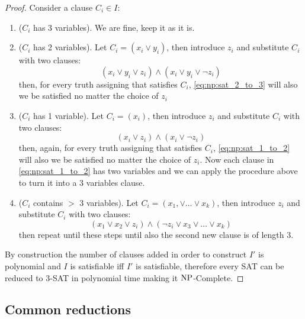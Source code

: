 \documentclass[12pt]{extarticle}
\newcommand{\NP}{{\operatorfont NP}}
\newcommand{\NPC}{$\NP$-Complete}
\begin{document}
\begin{proof}
    Consider a clause $C_i \in I$:
    \begin{enumerate}[label=\roman*.]
        \item ($C_i$ has 3 variables). We are fine, keep it as it is.
        \item ($C_i$ has 2 variables). Let $C_i = (x_i \lor y_i)$, then introduce $z_i$ and substitute $C_i$ with two clauses:
              \begin{equation}
                  \label{eq:np:sat_2_to_3}
                  (x_i \lor y_i \lor z_i) \land (x_i \lor y_i \lor \lnot z_i)
              \end{equation}
              then, for every truth assigning that satisfies $C_i$, \autoref{eq:np:sat_2_to_3} will also we be satisfied no matter the choice of $z_i$
        \item ($C_i$ has 1 variable). Let $C_i = (x_i)$, then introduce $z_i$ and substitute $C_i$ with two clauses:
              \begin{equation}
                  \label{eq:np:sat_1_to_2}
                  (x_i \lor z_i) \land (x_i \lor \lnot z_i)
              \end{equation}
              then, again, for every truth assigning that satisfies $C_i$, \autoref{eq:np:sat_1_to_2} will also we be satisfied no matter the choice of $z_i$.
              Now each clause in \autoref{eq:np:sat_1_to_2} has two variables and we can apply the procedure above to turn it into a 3 variables clause.
        \item ($C_i$ contains $>$ 3 variables). Let $C_i = (x_1, \lor \dots \lor x_k)$, then introduce $z_i$ and substitute $C_i$ with two clauses:
              \begin{equation}
                  (x_1 \lor x_2 \lor z_i) \land (\lnot z_i \lor x_3 \lor \dots \lor x_k)
              \end{equation}
              then repeat until these steps until also the second new clause is of length 3.
    \end{enumerate}

    By construction the number of clauses added in order to construct $I'$ is polynomial and $I$ is satisfiable iff $I'$ is satisfiable,
    therefore every SAT can be reduced to 3-SAT in polynomial time making it \NPC.
\end{proof}

\subsection{Common reductions}
\end{document}
